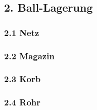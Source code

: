 \subsection{2. Ball-Lagerung}

\subsubsection{2.1 Netz}

\subsubsection{2.2 Magazin}

\subsubsection{2.3 Korb}

\subsubsection{2.4 Rohr}